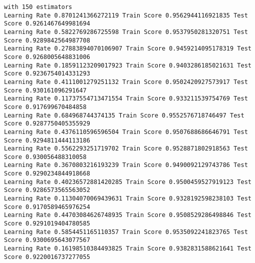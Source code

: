 \documentclass[11pt]{article}
\begin{document}
    \begin{Verbatim}[commandchars=\\\{\}]
with 150 estimators
Learning Rate 0.8701241366272119 Train Score 0.9562944116921835 Test Score 0.9261467649981694
Learning Rate 0.5822769286725598 Train Score 0.9537950281320751 Test Score 0.9289842564987708
Learning Rate 0.27883894070106907 Train Score 0.9459214095178319 Test Score 0.9268005648831006
Learning Rate 0.18591123209017923 Train Score 0.9403286185021631 Test Score 0.9236754014331293
Learning Rate 0.4111001279251132 Train Score 0.9502420927573917 Test Score 0.930161096291647
Learning Rate 0.11737554713471554 Train Score 0.933211539754769 Test Score 0.917699670484858
Learning Rate 0.684968744374135 Train Score 0.9552576718746497 Test Score 0.9287750405355929
Learning Rate 0.4376110596596504 Train Score 0.9507688686646791 Test Score 0.9294811444113186
Learning Rate 0.5562293251719702 Train Score 0.9528871802918563 Test Score 0.930056488310058
Learning Rate 0.3670803216193239 Train Score 0.9490092129743786 Test Score 0.9290234844918668
Learning Rate 0.40236572881420285 Train Score 0.9500459527919123 Test Score 0.9286573565563052
Learning Rate 0.11304070069439631 Train Score 0.9328192598238103 Test Score 0.9170589465976254
Learning Rate 0.44703084626748935 Train Score 0.9508529286498846 Test Score 0.9291019404780585
Learning Rate 0.5854451165110357 Train Score 0.9535092241823765 Test Score 0.9300695643077567
Learning Rate 0.16198510384493825 Train Score 0.9382831588621641 Test Score 0.9220016737277055

    \end{Verbatim}
\end{document}
